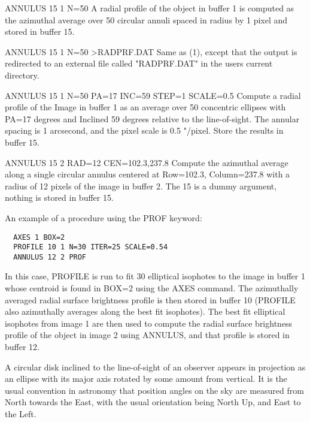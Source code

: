 \begin{example}
  \item[ANNULUS 15 1 N=50\hfill]{A radial profile of the object in buffer 1
       is computed as the azimuthal average over 50 circular annuli spaced
       in radius by 1 pixel and stored in buffer 15.}

  \item[ANNULUS 15 1 N=50 >RADPRF.DAT\hfill]{Same as (1), except that the
       output is redirected to an external file called "RADPRF.DAT" in the
       users current directory.}

  \item[ANNULUS 15 1 N=50 PA=17 INC=59 STEP=1 SCALE=0.5\hfill]{Compute a
       radial profile of the Image in buffer 1 as an average over 50
       concentric ellipses with PA=17 degrees and Inclined 59 degrees
       relative to the line-of-sight.  The annular spacing is 1 arcsecond,
       and the pixel scale is 0.5 "/pixel.  Store the results in buffer
       15.}

  \item[ANNULUS 15 2 RAD=12 CEN=102.3,237.8\hfill]{Compute the azimuthal
       average along a single circular annulus centered at Row=102.3,
       Column=237.8 with a radius of 12 pixels of the image in buffer 2.
       The 15 is a dummy argument, nothing is stored in buffer 15.}
\end{example}

An example of a procedure using the PROF keyword:
\begin{verbatim}
  AXES 1 BOX=2
  PROFILE 10 1 N=30 ITER=25 SCALE=0.54
  ANNULUS 12 2 PROF
\end{verbatim}
In this case, PROFILE is run to fit 30 elliptical isophotes to the image in
buffer 1 whose centroid is found in BOX=2 using the AXES command. The
azimuthally averaged radial surface brightness profile is then stored in
buffer 10 (PROFILE also azimuthally averages along the best fit
isophotes). The best fit elliptical isophotes from image 1 are then used to
compute the radial surface brightness profile of the object in image 2
using ANNULUS, and that profile is stored in buffer 12.


A circular disk inclined to the line-of-sight of an observer appears in
projection as an ellipse with its major axis rotated by some amount from
vertical.  It is the usual convention in astronomy that position angles on
the sky are measured from North towards the East, with the usual
orientation being North Up, and East to the Left.

